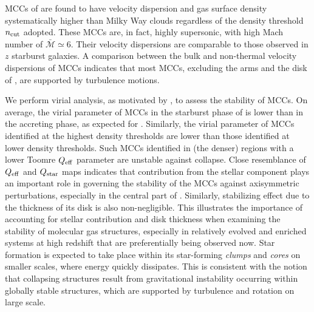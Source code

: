 \IfFileExists{emulateapjlegacy.cls}{\documentclass[iop]{emulateapjlegacy}}{\documentclass[iop]{emulateapj}}
\begin{document}
MCCs of \flower are found to have velocity dispersion and gas surface density systematically higher than Milky Way clouds regardless of the density threshold $n_{\rm cut}$ adopted. These MCCs are, in fact, highly supersonic, with high Mach number of $\bar{\mathcal{M}}\simeq6$. Their velocity dispersions are comparable to those observed in $z$ starburst galaxies. A comparison between the bulk and non-thermal velocity dispersions of MCCs indicates that most MCCs, excluding the arms and the disk of \flower, are supported by turbulence motions.

We perform virial analysis, as motivated by \obs, to assess the stability of MCCs. On average, the virial parameter of MCCs in the starburst phase of \flower is lower than in the accreting phase, as expected for \SF. Similarly, the virial parameter of MCCs identified at the highest density thresholds are lower than those identified at lower density thresholds. 
Such MCCs identified in (the denser) regions with a lower Toomre $Q_{\rm eff}$ parameter are unstable against collapse.
Close resemblance of $Q_{\rm eff}$ and $Q_{\rm star}$ maps indicates that contribution from the stellar component plays an important role in governing the stability of the MCCs against axisymmetric perturbations, especially in the central part of \flower. Similarly, stabilizing effect due to the thickness of its disk is also non-negligible. This illustrates the importance of accounting for stellar contribution and disk thickness when examining the stability of molecular gas structures, especially in relatively evolved and enriched systems at high redshift that are preferentially being observed now.
%
Star formation is expected to take place within its star-forming {\it clumps} and {\it cores} on smaller scales, where energy quickly dissipates. This is consistent with the notion that collapsing structures result from gravitational instability occurring within globally stable structures, which are supported by turbulence and rotation on large scale.
%
\end{document}
